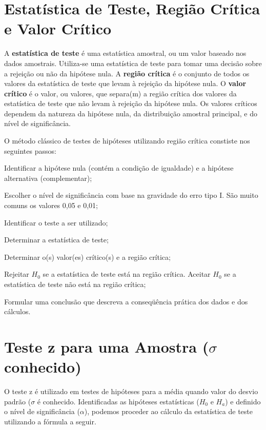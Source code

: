 \section{Estatística de Teste, Região Crítica e Valor Crítico}

A \textbf{estatística de teste} é uma estatística amostral, ou um valor baseado nos dados
amostrais. Utiliza-se uma estatística de teste para tomar uma decisão sobre a rejeição
ou não da hipótese nula. A \textbf{região crítica} é o conjunto de todos os valores da estatística de teste que levam à rejeição da hipótese nula. O \textbf{valor crítico} é o valor, ou valores, que separa(m) a região crítica dos valores da estatística de teste que não levam à rejeição da hipótese nula. Os valores críticos dependem da natureza da hipótese nula, da distribuição amostral principal, e do nível de significância.

O método clássico de testes de hipóteses  utilizando região crítica constiste nos seguintes passos:
\begin{alineas}
\item Identificar a hipótese nula (contém a condição de igualdade) e a hipótese alternativa (complementar);
\item Escolher o nível de significância com base na gravidade do erro tipo I. São
muito comuns os valores 0,05 e 0,01;
\item Identificar o teste a ser utilizado;
\item Determinar a estatística de teste;
\item Determinar o(s) valor(es) crítico(s) e a região crítica;
\item Rejeitar \(H_0\) se a estatística de teste está na região crítica. Aceitar \(H_0\) se a estatística de teste não está na região crítica;
\item Formular uma conclusão que descreva a conseqüência prática dos dados e dos cálculos.
\end{alineas}

\section{Teste z para uma Amostra (\(\sigma\) conhecido)}

O teste z é utilizado em testes de hipóteses para a média quando valor do desvio padrão (\(\sigma\) é conhecido. Identificadas as hipóteses estatísticas (\(H_0\) e \(H_a\)) e definido o nível de significância (\(\alpha\)), podemos proceder ao cálculo da estatística de teste utilizando a fórmula a seguir.

